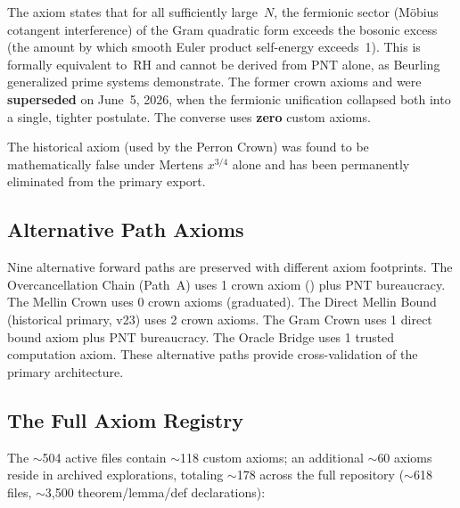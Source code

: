 \documentclass[11pt,a4paper]{article}
\begin{document}
\noindent
The axiom  states that for all
sufficiently large~$N$, the fermionic sector (M\"obius cotangent
interference) of the Gram quadratic form exceeds the bosonic excess
(the amount by which smooth Euler product self-energy exceeds~1).
This is formally equivalent to~RH and cannot be
derived from PNT alone, as Beurling generalized prime systems
demonstrate. The former crown axioms
 and 
were \textbf{superseded} on June~5, 2026, when the fermionic
unification collapsed both into a single, tighter postulate.
The converse uses \textbf{zero} custom axioms.

The historical axiom 
(used by the Perron Crown) was found to be mathematically false
under Mertens $x^{3/4}$ alone and has been permanently eliminated
from the primary export.

\subsection{Alternative Path Axioms}

Nine alternative forward paths are preserved with different axiom
footprints. The Overcancellation Chain (Path~A) uses 1 crown axiom
() plus PNT bureaucracy.
The Mellin Crown uses 0 crown axioms (graduated).
The Direct Mellin Bound (historical primary, v23) uses 2 crown axioms.
The Gram Crown uses 1 direct bound axiom plus PNT bureaucracy.
The Oracle Bridge uses 1 trusted computation axiom.
These alternative paths provide cross-validation of the primary
architecture.

\subsection{The Full Axiom Registry}

The $\sim$504 active files contain $\sim$118 custom axioms; an additional
$\sim$60 axioms reside in archived explorations, totaling $\sim$178 across
the full repository ($\sim$618 files, $\sim$3{,}500 theorem/lemma/def declarations):
\end{document}
